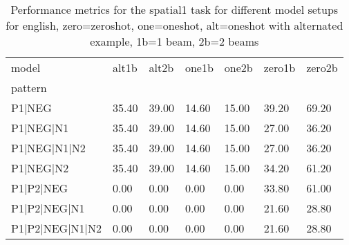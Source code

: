 \begin{table}[h]
\begin{tabular}{l|llllll}
\toprule
model & alt1b & alt2b & one1b & one2b & zero1b & zero2b \\
pattern &  &  &  &  &  &  \\
\midrule
P1|NEG & 35.40 & 39.00 & 14.60 & 15.00 & 39.20 & 69.20 \\
P1|NEG|N1 & 35.40 & 39.00 & 14.60 & 15.00 & 27.00 & 36.20 \\
P1|NEG|N1|N2 & 35.40 & 39.00 & 14.60 & 15.00 & 27.00 & 36.20 \\
P1|NEG|N2 & 35.40 & 39.00 & 14.60 & 15.00 & 34.20 & 61.20 \\
P1|P2|NEG & 0.00 & 0.00 & 0.00 & 0.00 & 33.80 & 61.00 \\
P1|P2|NEG|N1 & 0.00 & 0.00 & 0.00 & 0.00 & 21.60 & 28.80 \\
P1|P2|NEG|N1|N2 & 0.00 & 0.00 & 0.00 & 0.00 & 21.60 & 28.80 \\
\bottomrule
\end{tabular}
\caption{Performance metrics for the spatial1 task for different model setups for english, zero=zeroshot, one=oneshot, alt=oneshot with alternated example, 1b=1 beam, 2b=2 beams}
\label{tab:en_spatial1_performance}
\end{table}
